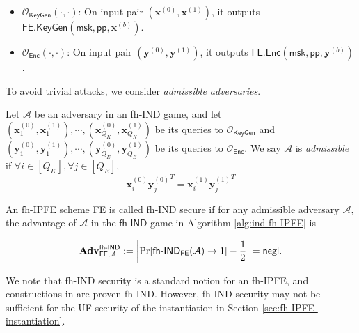 \begin{itemize}

	\item $\mathcal{O}_{\textsf{KeyGen}}(\cdot, \cdot)$: On input pair $(\mathbf{x}^{(0)}, \mathbf{x}^{(1)})$, it outputs $\textsf{FE.KeyGen}(\textsf{msk}, \textsf{pp}, \mathbf{x}^{(b)} )$.

	\item $\mathcal{O}_{\textsf{Enc}}(\cdot, \cdot)$: On input pair $(\mathbf{y}^{(0)}, \mathbf{y}^{(1)})$, it outputs $\textsf{FE.Enc}(\textsf{msk}, \textsf{pp}, \mathbf{y}^{(b)} )$.

\end{itemize}

\noindent To avoid trivial attacks, we consider \emph{admissible adversaries}.

\begin{definition}

	Let $\mathcal{A}$ be an adversary in an \textsf{fh-IND} game, and let $ (\mathbf{x}_1^{(0)}, \mathbf{x}_1^{(1)}), \cdots, (\mathbf{x}_{Q_K}^{(0)}, \mathbf{x}_{Q_K}^{(1)})$ be its queries to $\mathcal{O}_{\textsf{KeyGen}}$ and $(\mathbf{y}_1^{(0)}, \mathbf{y}_1^{(1)}), \cdots, (\mathbf{y}_{Q_E}^{(0)}, \mathbf{y}_{Q_E}^{(1)})$ be its queries to $\mathcal{O}_{\textsf{Enc}}$.
	We say $\mathcal{A}$ is \emph{admissible} if $\forall i \in [Q_K], \forall j \in [Q_E]$,
\[
	{\mathbf{x}^{(0)}_{i}} {\mathbf{y}^{(0)}_{j}}^T = {\mathbf{x}^{(1)}_{i}} {\mathbf{y}^{(1)}_{j}}^T
\]

\end{definition}


\begin{definition}

	An fh-IPFE scheme \textsf{FE} is called fh-IND secure if for any admissible adversary $\mathcal{A}$, the advantage of $\mathcal{A}$ in the $\textsf{fh-IND}$ game in Algorithm \ref{alg:ind-fh-IPFE} is

\[
	\mathbf{Adv}_{\textsf{FE}, \mathcal{A}}^{\textsf{fh-IND}} := \left| \Pr[\textsf{fh-IND}_{\textsf{FE}}(\mathcal{A}) \to 1 ] - \frac{1}{2} \right| = \mathsf{negl}.
\]

\end{definition}

We note that fh-IND security is a standard notion for an fh-IPFE, and constructions in \cite{cryptoeprint:2015/1255, 10.1007/978-3-319-45871-7_24, cryptoeprint:2016/440} are proven fh-IND. However, fh-IND security may not be sufficient for the UF security of the instantiation in Section \ref{sec:fh-IPFE-instantiation}. 

